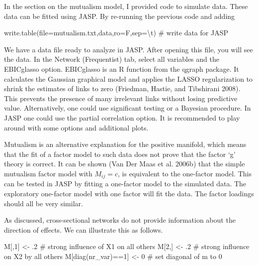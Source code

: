 \documentclass[
  letterpaper,
]{scrbook}
\newenvironment{Shaded}{\begin{snugshade}}{\end{snugshade}}
\newcommand{\AttributeTok}[1]{\textcolor[rgb]{0.40,0.45,0.13}{#1}}
\newcommand{\CommentTok}[1]{\textcolor[rgb]{0.37,0.37,0.37}{#1}}
\newcommand{\DecValTok}[1]{\textcolor[rgb]{0.68,0.00,0.00}{#1}}
\newcommand{\FunctionTok}[1]{\textcolor[rgb]{0.28,0.35,0.67}{#1}}
\newcommand{\NormalTok}[1]{\textcolor[rgb]{0.00,0.23,0.31}{#1}}
\newcommand{\OtherTok}[1]{\textcolor[rgb]{0.00,0.23,0.31}{#1}}
\newcommand{\SpecialCharTok}[1]{\textcolor[rgb]{0.37,0.37,0.37}{#1}}
\newcommand{\StringTok}[1]{\textcolor[rgb]{0.13,0.47,0.30}{#1}}
\begin{document}
In the section on the mutualism model, I provided code to simulate data.
These data can be fitted using JASP. By re-running the previous code and
adding

\begin{Shaded}
\begin{Highlighting}[]
\FunctionTok{write.table}\NormalTok{(}\AttributeTok{file=}\StringTok{\textquotesingle{}mutualism.txt\textquotesingle{}}\NormalTok{,data,}\AttributeTok{ro=}\NormalTok{F,}\AttributeTok{sep=}\StringTok{\textquotesingle{}}\SpecialCharTok{\textbackslash{}t}\StringTok{\textquotesingle{}}\NormalTok{) }\CommentTok{\# write data for JASP}
\end{Highlighting}
\end{Shaded}

We have a data file ready to analyze in JASP. After opening this file,
you will see the data. In the Network (Frequentist) tab, select all
variables and the EBICglasso option. EBICglasso is an R function from
the qgraph package. It calculates the Gaussian graphical model and
applies the LASSO regularization to shrink the estimates of links to
zero (Friedman, Hastie, and Tibshirani 2008). This prevents the presence
of many irrelevant links without losing predictive value. Alternatively,
one could use significant testing or a Bayesian procedure. In JASP one
could use the partial correlation option. It is recommended to play
around with some options and additional plots.

Mutualism is an alternative explanation for the positive manifold, which
means that the fit of a factor model to such data does not prove that
the factor `g' theory is correct. It can be shown (Van Der Maas et al.
2006b) that the simple mutualism factor model with \(M_{ij} = c\), is
equivalent to the one-factor model. This can be tested in JASP by
fitting a one-factor model to the simulated data. The exploratory
one-factor model with one factor will fit the data. The factor loadings
should all be very similar.

As discussed, cross-sectional networks do not provide information about
the direction of effects. We can illustrate this as follows.

\begin{Shaded}
\begin{Highlighting}[]
\NormalTok{M[,}\DecValTok{1}\NormalTok{] }\OtherTok{\textless{}{-}}\NormalTok{ .}\DecValTok{2} \CommentTok{\# strong influence of X1 on all others}
\NormalTok{M[}\DecValTok{2}\NormalTok{,] }\OtherTok{\textless{}{-}}\NormalTok{ .}\DecValTok{2} \CommentTok{\# strong influence on X2 by all others}
\NormalTok{M[}\FunctionTok{diag}\NormalTok{(nr\_var)}\SpecialCharTok{==}\DecValTok{1}\NormalTok{] }\OtherTok{\textless{}{-}} \DecValTok{0} \CommentTok{\# set diagonal of m to 0}
\end{Highlighting}
\end{Shaded}
\end{document}
